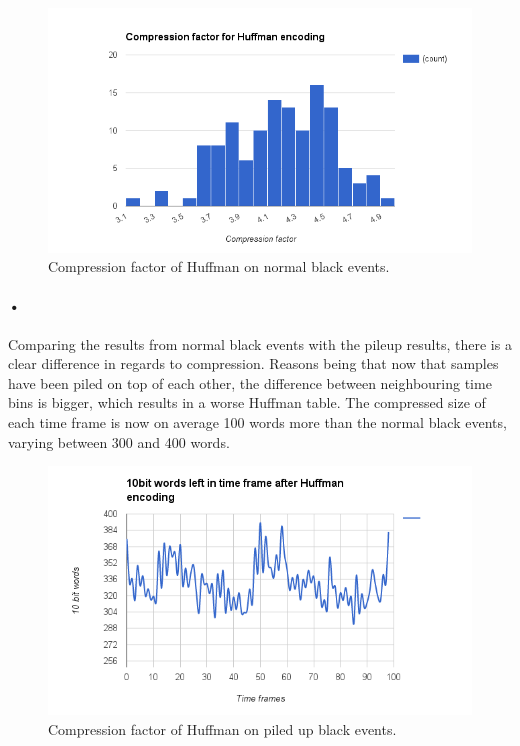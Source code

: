 \documentclass[a4paper, 12pt]{report}\dfrac{\right }{•}
\begin{document}
\begin{figure}[h!]
	\centering
		\includegraphics[width=1.0\textwidth]{images/compression-factor-huffman.png}
		\caption{Compression factor of Huffman on normal black events.}
		\label{fig:compression-factor-huffman}
\end{figure}

\paragraph{•}
Comparing the results from normal black events with the pileup results, there is a clear difference in regards to compression.
Reasons being that now that samples have been piled on top of each other, the difference between neighbouring time bins is bigger, which results in a worse Huffman table.
The compressed size of each time frame is now on average 100 words more than the normal black events, varying between 300 and 400 words.

\begin{figure}[h!]
	\centering
		\includegraphics[width=1.0\textwidth]{images/blackevents-pileup-huffman.png}
		\caption{Compression factor of Huffman on piled up black events.}
		\label{fig:blackevents-huffman-pileup}
\end{figure}
\end{document}
